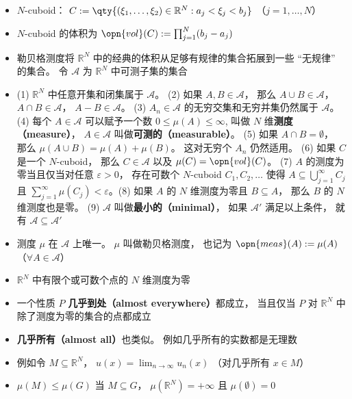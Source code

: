 \begin{itemize}
\item $N$-cuboid： $C := \qty{(\xi_1, \dots, \xi_2) \in \mathbb R^N: a_j < \xi_j < b_j}$ （$j = 1, \dots, N$）

\item $N$-cuboid 的体积为 $\opn{vol}(C) := \prod_{j=1}^N(b_j - a_j)$

\item 勒贝格测度将 $\mathbb R^N$ 中的经典的体积从足够有规律的集合拓展到一些 “无规律” 的集合。 令 $\mathcal A$ 为 $\mathbb R^N$ 中可测子集的集合

\item (1) $\mathbb R^N$ 中任意开集和闭集属于 $\mathcal A$。 (2) 如果 $A, B \in \mathcal A$， 那么 $A\cup B \in \mathcal A$， $A\cap B \in \mathcal A$， $A - B \in \mathcal A$。 (3) $A_n \in \mathcal A$ 的无穷交集和无穷并集仍然属于 $\mathcal A$。 (4) 每个 $A \in\mathcal A$ 可以赋予一个数 $0 \le \mu(A) \le \infty$, 叫做 $N$ 维\textbf{测度（measure）}， $A\in\mathcal A$ 叫做\textbf{可测的（measurable）}。 (5) 如果 $A\cap B = \emptyset$， 那么 $\mu(A\cup B) = \mu(A) + \mu(B)$。 这对无穷个 $A_n$ 仍然适用。 (6) 如果 $C$ 是一个 $N$-cuboid， 那么 $C\in\mathcal A$ 以及 $\mu(C) = \opn{vol}(C)$。 (7) $A$ 的测度为零当且仅当对任意 $\varepsilon>0$， 存在可数个 $N$-cuboid $C_1, C_2, \dots$ 使得 $A \subseteq \bigcup_{j=1}^\infty C_j$ 且 $\sum_{j=1}^\infty \mu(C_j) < \varepsilon$。(8) 如果 $A$ 的 $N$ 维测度为零且 $B\subseteq A$， 那么 $B$ 的 $N$ 维测度也是零。 (9) $\mathcal A$ 叫做\textbf{最小的（minimal）}， 如果 $\mathcal A'$ 满足以上条件， 就有 $\mathcal A \subseteq \mathcal A'$

\item 测度 $\mu$ 在 $\mathcal A$ 上唯一。 $\mu$ 叫做勒贝格测度， 也记为 $\opn{meas}(A) := \mu(A)$ （$\forall A\in\mathcal A$）

\item $\mathbb R^N$ 中有限个或可数个点的 $N$ 维测度为零

\item 一个性质 $P$ \textbf{几乎到处（almost everywhere）}都成立， 当且仅当 $P$ 对 $\mathbb R^N$ 中除了测度为零的集合的点都成立

\item \textbf{几乎所有（almost all）}也类似。 例如几乎所有的实数都是无理数

\item 例如令 $M\subseteq\mathbb R^N$， $u(x) = \lim_{n\to\infty} u_n(x)$ （对几乎所有 $x\in M$）

\item $\mu(M)\le\mu(G)$ 当 $M\subseteq G$， $\mu(\mathbb R^N) = +\infty$ 且 $\mu(\emptyset) = 0$
\end{itemize}

